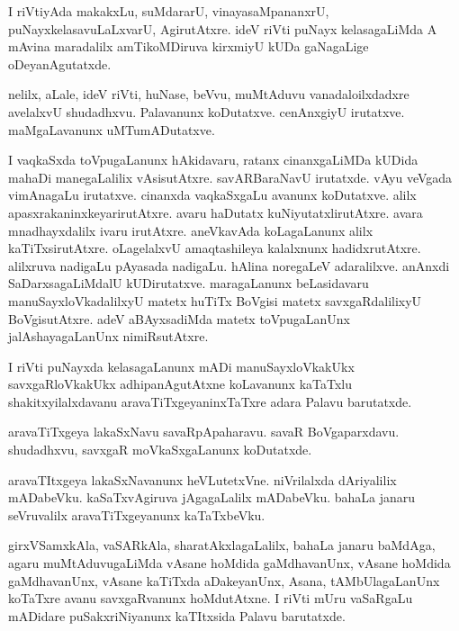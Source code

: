 \documentclass{article}
\begin{document}
\begin{mng}%
I riVtiyAda makakxLu, suMdararU, vinayasaMpananxrU, 
puNayxkelasavuLaLxvarU, AgirutAtxre. ideV riVti puNayx kelasagaLiMda A 
mAvina maradalilx amTikoMDiruva kirxmiyU kUDa gaNagaLige 
oDeyanAgutatxde.
\end{mng}

\begin{mng}%
nelilx, aLale, ideV riVti, huNase, beVvu, muMtAduvu vanadaloilxdadxre 
avelalxvU shudadhxvu. Palavanunx koDutatxve. cenAnxgiyU irutatxve. 
maMgaLavanunx uMTumADutatxve.
\end{mng}

\begin{mng}%
I vaqkaSxda toVpugaLanunx hAkidavaru, ratanx cinanxgaLiMDa kUDida 
mahaDi manegaLalilix vAsisutAtxre. savARBaraNavU irutatxde. vAyu 
veVgada vimAnagaLu irutatxve. cinanxda vaqkaSxgaLu avanunx koDutatxve. 
alilx apasxrakaninxkeyarirutAtxre. avaru haDutatx 
kuNiyutatxlirutAtxre. avara mnadhayxdalilx ivaru irutAtxre. aneVkavAda 
koLagaLanunx alilx kaTiTxsirutAtxre. oLagelalxvU amaqtashileya 
kalalxnunx hadidxrutAtxre. alilxruva nadigaLu pAyasada nadigaLu. 
hAlina noregaLeV adaralilxve. anAnxdi SaDarxsagaLiMdalU kUDirutatxve. 
maragaLanunx beLasidavaru manuSayxloVkadalilxyU matetx huTiTx BoVgisi 
matetx savxgaRdalilixyU BoVgisutAtxre. adeV aBAyxsadiMda matetx 
toVpugaLanUnx jalAshayagaLanUnx nimiRsutAtxre.
\end{mng}

\begin{mng}%
I riVti puNayxda kelasagaLanunx mADi manuSayxloVkakUkx 
savxgaRloVkakUkx adhipanAgutAtxne koLavanunx kaTaTxlu 
shakitxyilalxdavanu aravaTiTxgeyaninxTaTxre adara Palavu barutatxde.
\end{mng}

\begin{mng}%
aravaTiTxgeya lakaSxNavu savaRpApaharavu. savaR BoVgaparxdavu. 
shudadhxvu, savxgaR moVkaSxgaLanunx koDutatxde.
\end{mng}

\begin{mng}%
aravaTItxgeya lakaSxNavanunx heVLutetxVne. niVrilalxda dAriyalilix 
mADabeVku. kaSaTxvAgiruva jAgagaLalilx mADabeVku. bahaLa janaru 
seVruvalilx aravaTiTxgeyanunx kaTaTxbeVku.
\end{mng}

\begin{mng}%
girxVSamxkAla, vaSARkAla, sharatAkxlagaLalilx, bahaLa janaru baMdAga, 
agaru muMtAduvugaLiMda vAsane hoMdida gaMdhavanUnx, vAsane hoMdida 
gaMdhavanUnx, vAsane kaTiTxda aDakeyanUnx, Asana, tAMbUlagaLanUnx 
koTaTxre avanu savxgaRvanunx hoMdutAtxne. I riVti mUru vaSaRgaLu 
mADidare puSakxriNiyanunx kaTItxsida Palavu barutatxde.
\end{mng}
\end{document}

